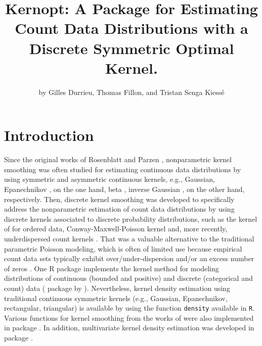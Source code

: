 \title{Kernopt: A Package for Estimating Count Data Distributions with a Discrete Symmetric Optimal Kernel.}


\author{by Gilles Durrieu, Thomas Fillon, and Tristan Senga Kiessé}

\maketitle


\makeatletter
\newsavebox\pandoc@box
\newcommand*\pandocbounded[1]{%
  \sbox\pandoc@box{#1}%
  \ifdim\wd\pandoc@box>\linewidth
    \resizebox{\linewidth}{!}{\copy\pandoc@box}%
  \else
    \copy\pandoc@box
  \fi
}
\makeatother

\section{Introduction}\label{introduction}

Since the original works of Rosenblatt \citep{Rosenblatt1956} and Parzen \citep{Parzen1962}, nonparametric kernel smoothing was often studied for estimating continuous data distributions by using symmetric and asymmetric continuous kernels, e.g., Gaussian, Epanechnikov \citep{Epan69}, on the one hand, beta \citep{Chen99}, inverse Gaussian \citep{scaillet2004}, on the other hand, respectively. Then, discrete kernel smoothing was developed to specifically address the nonparametric estimation of count data distributions by using discrete kernels associated to discrete probability distributions, such as the kernel of \citet{Racine2020} for ordered data, Conway-Maxwell-Poisson kernel \citep{Huang2022} and, more recently, underdispersed count kernels \citep{Kokon_etal_2023}. That was a valuable alternative to the traditional parametric Poisson modeling, which is often of limited use because empirical count data sets typically exhibit over/under-dispersion and/or an excess number of zeros \citep{KokonSenga11}. One R package implements the kernel method for modeling distributions of continuous (bounded and positive) and discrete (categorical and count) data ( package by \citet{Wansouwe2016}). Nevertheless, kernel density estimation using traditional continuous symmetric kernels (e.g., Gaussian, Epanechnikov, rectangular, triangular) is available by using the function \texttt{density} available in \texttt{R}. Various functions for kernel smoothing from the works of \citet{WandJones1995} were also implemented in  package \citep{Kernsmooth}. In addition, multivariate kernel density estimation was developed in  package \citep{Duong2007}.

